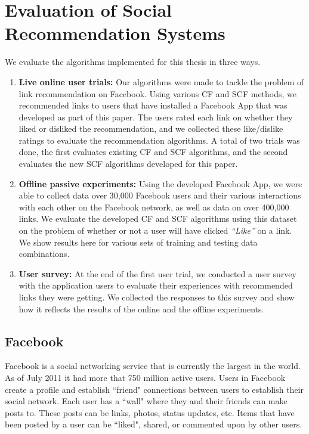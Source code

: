 
\chapter{Evaluation of Social Recommendation Systems}

We evaluate the algorithms implemented for this thesis in three ways. 

\begin{enumerate}
\item{\bf Live online user trials:} Our algorithms were made to tackle the problem of link recommendation on Facebook. Using various CF and SCF methods, we recommended links to users that have installed a Facebook App that was developed as part of this paper. The users rated each link on whether they liked or disliked the recommendation, and we collected these like/dislike ratings to evaluate the recommendation algorithms. A total of two trials was done, the first evaluates existing CF and SCF algorithms, and the second evaluates the new SCF algorithms developed for this paper.

\item{\bf Offline passive experiments:} Using the developed Facebook App, we were able to collect data over 30,000 Facebook users and their various interactions with each other on the Facebook network, as well as data on over 400,000 links. We evaluate the developed CF and SCF algorithms using this dataset on the problem of whether or not a user will have clicked \emph{``Like''} on a link. We show results here for various sets of training and testing data combinations.

\item{\bf User survey:} At the end of the first user trial, we conducted a user survey with the application users to evaluate their experiences with recommended links they were getting. We collected the responses to this survey and show how it reflects the results of the online and the offline experiments.

\end{enumerate}

\section{Facebook}

Facebook is a social networking service that is currently the largest in the world. As of July 2011 it had more that 750 million active users. Users in Facebook create a profile and establish ``friend" connections between users to establish their social network. Each user has a ``wall" where they and their friends can make posts to. These posts can be links, photos, status updates, etc. Items that have been posted by a user can be ``liked", shared, or commented upon by other users. 


